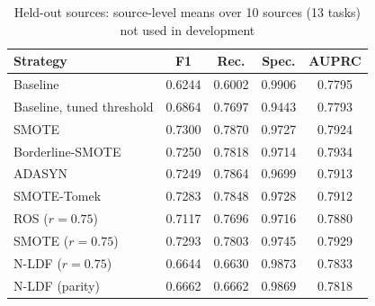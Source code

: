 \begin{table}[htbp]
\caption{Held-out sources: source-level means over 10 sources (13 tasks) not
used in development}
\label{tab:heldout}
\centering
\tabsmall
\setlength{\tabcolsep}{4pt}
\begin{tabular}{lcccc}
\toprule
\textbf{Strategy} & \textbf{F1} & \textbf{Rec.} & \textbf{Spec.} & \textbf{AUPRC} \\
\midrule
Baseline & 0.6244 & 0.6002 & 0.9906 & 0.7795 \\
Baseline, tuned threshold & 0.6864 & 0.7697 & 0.9443 & 0.7793 \\
SMOTE & 0.7300 & 0.7870 & 0.9727 & 0.7924 \\
Borderline-SMOTE & 0.7250 & 0.7818 & 0.9714 & 0.7934 \\
ADASYN & 0.7249 & 0.7864 & 0.9699 & 0.7913 \\
SMOTE-Tomek & 0.7283 & 0.7848 & 0.9728 & 0.7912 \\
ROS ($r=0.75$) & 0.7117 & 0.7696 & 0.9716 & 0.7880 \\
SMOTE ($r=0.75$) & 0.7293 & 0.7803 & 0.9745 & 0.7929 \\
N-LDF ($r=0.75$) & 0.6644 & 0.6630 & 0.9873 & 0.7833 \\
N-LDF (parity) & 0.6662 & 0.6662 & 0.9869 & 0.7818 \\
\bottomrule
\end{tabular}
\end{table}
